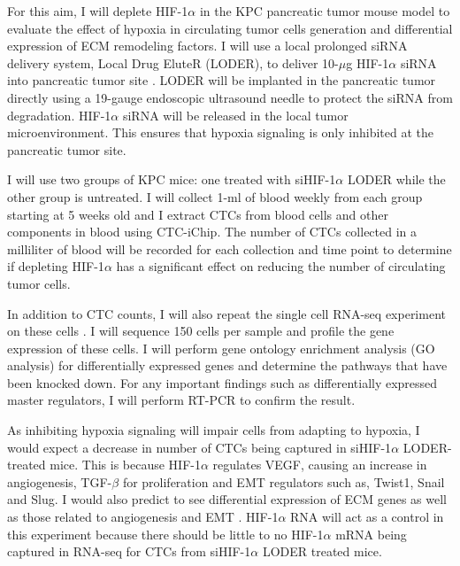 \documentclass[11pts]{article}
\begin{document}
\newline
\noindent For this aim, I will deplete HIF-1$\alpha$ in the KPC pancreatic tumor mouse model to evaluate the effect of hypoxia in circulating tumor cells generation and differential expression of ECM remodeling factors. I will use a local prolonged siRNA delivery system, Local Drug EluteR (LODER), to deliver 10-$\mu$g HIF-1$\alpha$ siRNA into pancreatic tumor site \cite{Zorde-Khvalevsky:2013fk}. LODER will be implanted in the pancreatic tumor directly using a 19-gauge endoscopic ultrasound needle to protect the siRNA from degradation. HIF-1$\alpha$ siRNA will be released in the local tumor microenvironment. This ensures that hypoxia signaling is only inhibited at the pancreatic tumor site.
 \newline

\noindent I will use two groups of KPC mice: one treated with siHIF-1$\alpha$ LODER while the other group is untreated.  I will collect 1-ml of blood weekly from each group starting at 5 weeks old and I extract CTCs from blood cells and other components in blood using CTC-iChip. The number of CTCs collected in a milliliter of blood will be recorded for each collection and time point to determine if depleting HIF-1$\alpha$ has a significant effect on reducing the number of circulating tumor cells. 
\newline

\noindent In addition to CTC counts, I will also repeat the single cell RNA-seq experiment on these cells \cite{Ting:zl}. I will sequence 150 cells per sample and profile the gene expression of these cells. I will perform gene ontology enrichment analysis (GO analysis) for differentially expressed genes and determine the pathways that have been knocked down. For any important findings such as differentially expressed master regulators, I will perform RT-PCR to confirm the result.  
\newline

\noindent As inhibiting hypoxia signaling will impair cells from adapting to hypoxia, I would expect a decrease in number of CTCs being captured in siHIF-1$\alpha$ LODER-treated mice. This is because HIF-1$\alpha$ regulates VEGF, causing an increase in angiogenesis, TGF-$\beta$ for proliferation and EMT regulators such as, Twist1, Snail and Slug. I would also predict to see differential expression of ECM genes as well as those related to angiogenesis and EMT \cite{Pugh:2003kx}. HIF-1$\alpha$ RNA will act as a control in this experiment because there should be little to no HIF-1$\alpha$ mRNA being captured in RNA-seq for CTCs from siHIF-1$\alpha$ LODER treated mice. 
\newline
\end{document}

